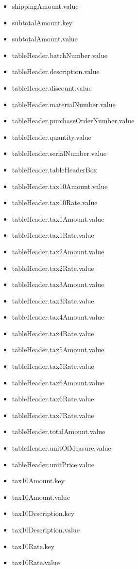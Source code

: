 \begin{multicols}{2}
\begin{itemize}
\item[] shippingAmount.value
\item[] subtotalAmount.key
\item[] subtotalAmount.value
\item[] tableHeader.batchNumber.value
\item[] tableHeader.description.value
\item[] tableHeader.discount.value
\item[] tableHeader.materialNumber.value
\item[] tableHeader.purchaseOrderNumber.value
\item[] tableHeader.quantity.value
\item[] tableHeader.serialNumber.value
\item[] tableHeader.tableHeaderBox
\item[] tableHeader.tax10Amount.value
\item[] tableHeader.tax10Rate.value
\item[] tableHeader.tax1Amount.value
\item[] tableHeader.tax1Rate.value
\item[] tableHeader.tax2Amount.value
\item[] tableHeader.tax2Rate.value
\item[] tableHeader.tax3Amount.value
\item[] tableHeader.tax3Rate.value
\item[] tableHeader.tax4Amount.value
\item[] tableHeader.tax4Rate.value
\item[] tableHeader.tax5Amount.value
\item[] tableHeader.tax5Rate.value
\item[] tableHeader.tax6Amount.value
\item[] tableHeader.tax6Rate.value
\item[] tableHeader.tax7Rate.value
\item[] tableHeader.totalAmount.value
\item[] tableHeader.unitOfMeasure.value
\item[] tableHeader.unitPrice.value
\item[] tax10Amount.key
\item[] tax10Amount.value
\item[] tax10Description.key
\item[] tax10Description.value
\item[] tax10Rate.key
\item[] tax10Rate.value

\end{itemize}
\end{multicols}
